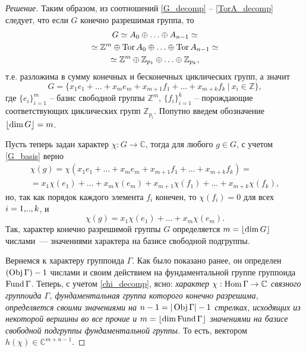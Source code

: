 \begin{proof}[Решение]
    Таким образом, из соотношений \eqref{G_decomp} -- \eqref{TorA_decomp} 
    следует, что если $G$ конечно разрешимая группа, то
    \begin{gather*}
        G \simeq A_0 \oplus \ldots \oplus A_{n-1} \simeq \\ 
        \simeq \mathbb{Z}^m \oplus \operatorname*{Tor} A_0 \oplus \ldots \oplus \operatorname*{Tor} A_{n-1} \simeq \\
        \simeq \mathbb{Z}^m \oplus \mathbb{Z}_{p_1} \oplus \ldots \oplus \mathbb{Z}_{p_k},
    \end{gather*}
    т.е. разложима в сумму конечных и бесконечных циклических групп, а значит
    \begin{equation}\label{G_basis}
        G = 
        \{x_1 e_1 + \ldots + x_m e_m + x_{m+1} f_1 + \ldots + x_{m+k} f_k 
        \:|\: x_i \in \mathbb{Z}\},
    \end{equation}
    где $\{e_i\}_{i=1}^m$ -- базис свободной группы $\mathbb{Z}^m$, $\{f_i\}_{i=1}^k$ -- 
    порождающие соответствующих циклических групп $\mathbb{Z}_{p_i}$. Попутно 
    введем обозначение $\lfloor \dim G \rfloor = m$.

    Пусть теперь задан характер $\chi: G \to \mathbb{C}$, тогда для любого 
    $g \in G$, с учетом \eqref{G_basis} верно
    \begin{multline*}
        \chi(g) = \chi(x_1 e_1 + \ldots + x_m e_m 
        + x_{m+1} f_1 + \ldots + x_{m+k} f_k ) = \\
        = x_1 \chi(e_1) + \ldots + x_m \chi(e_m) 
        + x_{m+1} \chi(f_1) + \ldots + x_{m+k} \chi(f_k),
    \end{multline*}
    но, так как порядок каждого элемента $f_i$ конечен, то $\chi(f_i) = 0$ для 
    всех $i=1 ,\!.., k$, и
    \begin{equation}\label{chi_decomp}
        \chi(g) = x_1 \chi(e_1) + \ldots + x_m \chi(e_m).
    \end{equation}
    Так, характер конечно разрешимой группы $G$ определяется $m = \lfloor \dim G \rfloor$ числами~--- 
    значениями характера на базисе свободной подгруппы.

    \bigskip

    Вернемся к характеру группоида $\Gamma$. Как было показано ранее, он 
    определен $(\operatorname*{Obj} \Gamma) - 1$ числами и своим действием на фундаментальной 
    группе группоида $\operatorname*{Fund} \Gamma$. Теперь, с учетом \eqref{chi_decomp}, ясно:
    \emph{характер $\chi :\operatorname*{Hom} \Gamma \to \mathbb{C}$ связного группоида 
    $\Gamma$, фундаментальная группа которого конечно разрешима, определяется 
    своими значениями на $n - 1 = |\operatorname*{Obj} \Gamma| - 1$ стрелках, исходящих из некоторой 
    вершины во все прочие и $m = \lfloor \dim \operatorname*{Fund} \Gamma \rfloor$ значениями на базисе 
    свободной подгруппы фундаментальной группы.} То есть, вектором 
    $h(\chi) \in \mathbb{C}^{m+n-1}$.


\end{proof}
